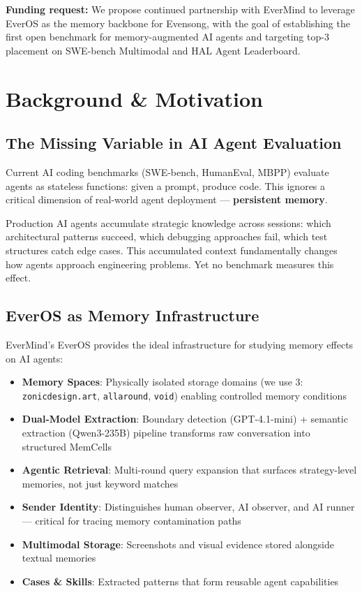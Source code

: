 \documentclass[11pt, a4paper]{article}
\begin{document}
\textbf{Funding request:} We propose continued partnership with EverMind to leverage EverOS as the memory backbone for Evensong, with the goal of establishing the first open benchmark for memory-augmented AI agents and targeting top-3 placement on SWE-bench Multimodal and HAL Agent Leaderboard.

\clearpage
\tableofcontents
\clearpage

\section{Background \& Motivation}

\subsection{The Missing Variable in AI Agent Evaluation}

Current AI coding benchmarks (SWE-bench, HumanEval, MBPP) evaluate agents as stateless functions: given a prompt, produce code. This ignores a critical dimension of real-world agent deployment --- \textbf{persistent memory}.

Production AI agents accumulate strategic knowledge across sessions: which architectural patterns succeed, which debugging approaches fail, which test structures catch edge cases. This accumulated context fundamentally changes how agents approach engineering problems. Yet no benchmark measures this effect.

\subsection{EverOS as Memory Infrastructure}

EverMind's EverOS provides the ideal infrastructure for studying memory effects on AI agents:

\begin{itemize}
  \item \textbf{Memory Spaces}: Physically isolated storage domains (we use 3: \texttt{zonicdesign.art}, \texttt{allaround}, \texttt{void}) enabling controlled memory conditions
  \item \textbf{Dual-Model Extraction}: Boundary detection (GPT-4.1-mini) + semantic extraction (Qwen3-235B) pipeline transforms raw conversation into structured MemCells
  \item \textbf{Agentic Retrieval}: Multi-round query expansion that surfaces strategy-level memories, not just keyword matches
  \item \textbf{Sender Identity}: Distinguishes human observer, AI observer, and AI runner --- critical for tracing memory contamination paths
  \item \textbf{Multimodal Storage}: Screenshots and visual evidence stored alongside textual memories
  \item \textbf{Cases \& Skills}: Extracted patterns that form reusable agent capabilities
\end{itemize}
\end{document}

